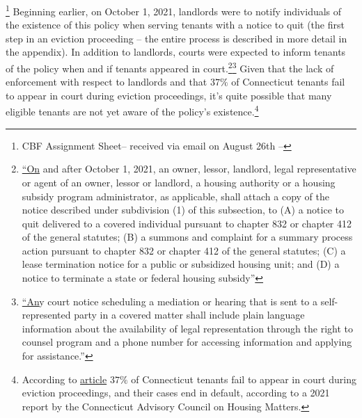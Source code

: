 \documentclass[a4paper,12pt]{article}
\begin{document}
\footnote{CBF Assignment Sheet-- received via email on August 26th --}  Beginning earlier, on October 1, 2021, landlords were to notify individuals of the existence of this policy when serving tenants with a notice to quit (the first step in an eviction proceeding -- the entire process is described in more detail in the appendix). In addition to landlords, courts were expected to inform tenants of the policy when and if tenants appeared in court.\footnote{\href{https://www.cga.ct.gov/2021/ACT/PA/PDF/2021PA-00034-R00HB-06531-PA.PDF}{``On} and after October 1, 2021, an owner, lessor, landlord, legal
representative or agent of an owner, lessor or landlord, a housing
authority or a housing subsidy program administrator, as applicable,
shall attach a copy of the notice described under subdivision (1) of this
subsection, to (A) a notice to quit delivered to a covered individual
pursuant to chapter 832 or chapter 412 of the general statutes; (B) a
summons and complaint for a summary process action pursuant to
chapter 832 or chapter 412 of the general statutes; (C) a lease termination
notice for a public or subsidized housing unit; and (D) a notice to
terminate a state or federal housing subsidy''}\footnote{\href{https://www.cga.ct.gov/2021/ACT/PA/PDF/2021PA-00034-R00HB-06531-PA.PDF}{``An}y court notice scheduling a mediation or hearing that is sent to
a self-represented party in a covered matter shall include plain language
information about the availability of legal representation through the
right to counsel program and a phone number for accessing information
and applying for assistance.''} Given that the lack of enforcement with respect to landlords and that $37\%$ of Connecticut tenants fail to appear in court during eviction proceedings, it's quite possible that many eligible tenants are not yet aware of the policy's existence.\footnote{According to \href{https://www.ctpublic.org/news/2022-01-30/some-residents-facing-eviction-could-now-be-eligible-for-free-legal-aid}{article} $37\%$ of Connecticut tenants fail to appear in court during eviction proceedings, and their cases end in default, according to a 2021 report by the Connecticut Advisory Council on Housing Matters.}
\end{document}
